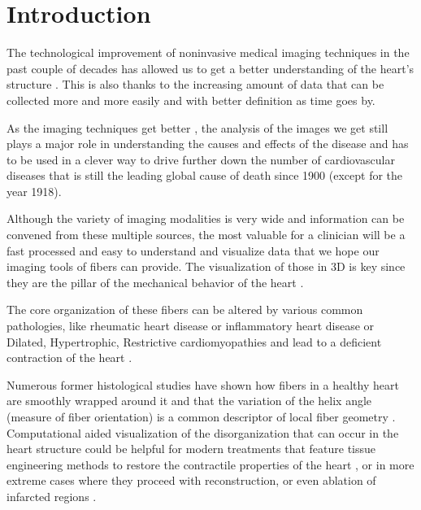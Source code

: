 \chapter{Introduction}

The technological improvement of noninvasive medical imaging techniques in the past couple of decades has allowed us to get a better understanding of the heart's structure \cite{sinusas2008multimodality}. This is also thanks to the increasing amount of data that can be collected more and more easily and with better definition as time goes by.

As the imaging techniques get better \cite{shaw2010cardiovascular}, the analysis of the images we get still plays a major role in understanding the causes and effects of the disease and has to be used in a clever way to drive further down the number of cardiovascular diseases that is still the leading global cause of death \cite{mozaffarian2015heart} since 1900 (except for the year 1918).

Although the variety of imaging modalities is very wide and information can be convened from these multiple sources, the most valuable for a clinician will be a fast processed and easy to understand and visualize data that we hope our imaging tools of fibers can provide. The visualization of those in 3D is key since they are the pillar of the mechanical behavior of the heart \cite{hooks2002cardiac}.

The core organization of these fibers can be altered by various common pathologies, like rheumatic heart disease or inflammatory heart disease or Dilated, Hypertrophic, Restrictive cardiomyopathies and lead to a deficient contraction of the heart \cite{kerwin2000ventricular, beg2004computational}.

Numerous former histological studies have shown how fibers in a healthy heart are smoothly wrapped around it and that the variation of the helix angle (measure of fiber orientation) is a common descriptor of local fiber geometry \cite{geerts2002characterization}. Computational aided visualization of the disorganization that can occur in the heart structure could be helpful for modern treatments that feature tissue engineering methods to restore the contractile properties of the heart \cite{caplan2006mesenchymal,laflamme2007cardiomyocytes,laflamme2005regenerating, song2012heart, zimmermann2004engineered}, or in more extreme cases where they proceed with reconstruction, or even ablation of infarcted regions \cite{athanasuleas2004surgical, di2001effects, jones2009coronary, sartipy2005dor}.

